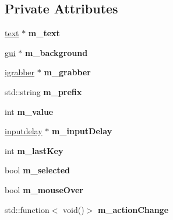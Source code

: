 \subsection*{Private Attributes}
\begin{DoxyCompactItemize}
\item 
\mbox{\label{classflounder_1_1inputgrabber_a9a965db3d095f40a4d52a8713a376600}} 
\hyperlink{classflounder_1_1text}{text} $\ast$ {\bfseries m\+\_\+text}
\item 
\mbox{\label{classflounder_1_1inputgrabber_a8aac6d523097c2f1ff77b7fe35c9e368}} 
\hyperlink{classflounder_1_1gui}{gui} $\ast$ {\bfseries m\+\_\+background}
\item 
\mbox{\label{classflounder_1_1inputgrabber_ac93d7c723cfebae50f4724e7192cc132}} 
\hyperlink{classflounder_1_1igrabber}{igrabber} $\ast$ {\bfseries m\+\_\+grabber}
\item 
\mbox{\label{classflounder_1_1inputgrabber_aadadca0cc347151888821224014c122b}} 
std\+::string {\bfseries m\+\_\+prefix}
\item 
\mbox{\label{classflounder_1_1inputgrabber_aed3312cd1f4fdd4f6ab305c112e3ad3a}} 
int {\bfseries m\+\_\+value}
\item 
\mbox{\label{classflounder_1_1inputgrabber_ab5a764ad815421a67a15e28d029d2566}} 
\hyperlink{classflounder_1_1inputdelay}{inputdelay} $\ast$ {\bfseries m\+\_\+input\+Delay}
\item 
\mbox{\label{classflounder_1_1inputgrabber_a2040838a8f4939a7e7adaed49c2f1729}} 
int {\bfseries m\+\_\+last\+Key}
\item 
\mbox{\label{classflounder_1_1inputgrabber_aa45f51dc3838d5941ec54d241ab84d66}} 
bool {\bfseries m\+\_\+selected}
\item 
\mbox{\label{classflounder_1_1inputgrabber_a4dc7ccf0eace872f0c0662301f6d6f54}} 
bool {\bfseries m\+\_\+mouse\+Over}
\item 
\mbox{\label{classflounder_1_1inputgrabber_a9b86cfa1cf976e763ea0a1a50f2a5b33}} 
std\+::function$<$ void()$>$ {\bfseries m\+\_\+action\+Change}
\end{DoxyCompactItemize}
